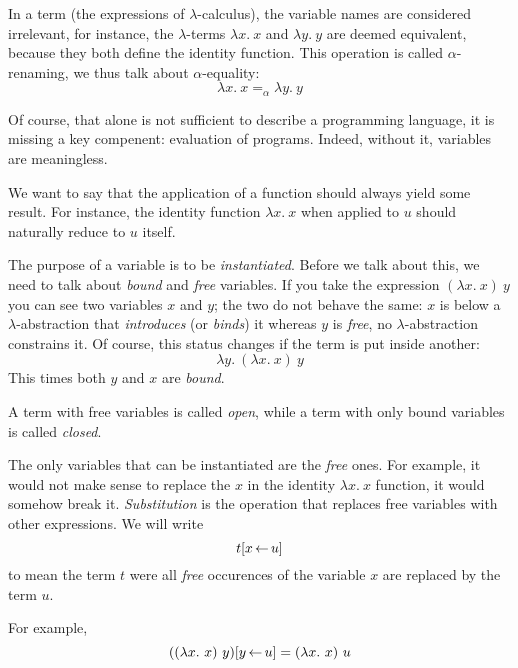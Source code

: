 In a term (the expressions of \(\lambda\)-calculus), the variable names are
considered irrelevant, for instance, the \(\lambda\)-terms \(\lambda x.\ x\)
and \(\lambda y.\ y\) are deemed equivalent, because they both define the
identity function.
This operation is called \(\alpha\)-renaming, we thus talk about
\(\alpha\)-equality:
\[
  \lambda x.\ x =_\alpha \lambda y.\ y
\]

Of course, that alone is not sufficient to describe a programming language,
it is missing a key compenent: evaluation of programs.
Indeed, without it, variables are meaningless.

We want to say that the application of a function should always yield some
result. For instance, the identity function \(\lambda x.\ x\) when applied to
\(u\) should naturally reduce to \(u\) itself.

The purpose of a variable is to be \emph{instantiated}.
Before we talk about this, we need to talk about \emph{bound} and \emph{free}
variables.
If you take the expression \((\lambda x.\ x)\ y\) you can see two variables
\(x\) and \(y\); the two do not behave the same: \(x\) is below a
\(\lambda\)-abstraction that \emph{introduces} (or \emph{binds}) it whereas
\(y\) is \emph{free}, no \(\lambda\)-abstraction constrains it.
Of course, this status changes if the term is put inside another:
\[
  \lambda y.\ (\lambda x.\ x)\ y
\]
This times both \(y\) and \(x\) are \emph{bound}.

A term with free variables is called \emph{open}, while a term with only bound
variables is called \emph{closed}.

The only variables that can be instantiated are the \emph{free} ones.
For example, it would not make sense to replace the \(x\) in the identity
\(\lambda x.\ x\) function, it would somehow break it. \emph{Substitution} is
the operation that replaces free variables with other expressions.
We will write
\[
  t[x \mathop{\leftarrow} u]
\]
to mean the term \(t\) were all \emph{free} occurences of the variable \(x\)
are replaced by the term \(u\).

For example,
\[
  ((\lambda x.\ x)\ y)[y \mathop{\leftarrow} u] = (\lambda x.\ x)\ u
\]

